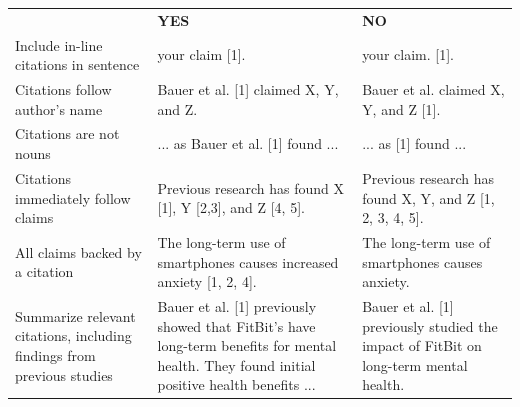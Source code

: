 \begin{center}

\small %
\def\arraystretch{2}
\begin{tabular}{p{6cm} p{4cm} p{4cm}}
& \textbf{YES} & \textbf{NO} \\
 \cmidrule{2-2}  \cmidrule{3-3} 
Include in-line citations in sentence & your claim [1]. & your claim. [1]. \\
Citations follow author's name & Bauer et al. [1] claimed X, Y, and Z. & Bauer et al. claimed X, Y, and Z [1]. \\
Citations are not nouns & ... as Bauer et al. [1] found ... & ... as [1] found ... \\
Citations immediately follow claims & Previous research has found X [1], Y [2,3], and Z [4, 5]. &  Previous research has found X, Y, and Z [1, 2, 3, 4, 5]. \\
All claims backed by a citation & The long-term use of smartphones causes increased anxiety [1, 2, 4]. & The long-term use of smartphones causes anxiety.  \\
Summarize relevant citations, including findings from previous studies & Bauer et al. [1] previously showed that FitBit's have long-term benefits for mental health. They found initial positive health benefits ... & Bauer et al. [1] previously studied the impact of FitBit on long-term mental health. \\
\end{tabular}
\end{center}







